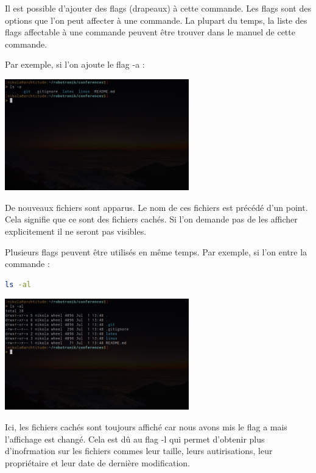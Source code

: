 Il est possible d'ajouter des flags (drapeaux) à cette commande. Les flags sont des options que l'on peut affecter à une commande. La plupart du temps, la liste des flags affectable à une commande peuvent être trouver dans le manuel de cette commande.

Par exemple, si l'on ajoute le flag -a :

\begin{center}
	\includegraphics[width=0.6\textwidth]{Images/ls-a.png}
\end{center}

De nouveaux fichiers sont apparus. Le nom de ces fichiers est précédé d'un point. Cela signifie que ce sont des fichiers cachés. Si l'on demande pas de les afficher explicitement il ne seront pas visibles.

Plusieurs flags peuvent être utilisés en même temps. Par exemple, si l'on entre la commande :
\begin{lstlisting}[language=bash]
	ls -al
\end{lstlisting}

\begin{center}
	\includegraphics[width=0.6\textwidth]{Images/ls-al.png}
\end{center}

Ici, les fichiers cachés sont toujours affiché car nous avons mis le flag a mais l'affichage est changé. Cela est dû au flag -l qui permet d'obtenir plus d'inofrmation sur les fichiers commes leur taille, leurs autirisations, leur propriétaire et leur date de dernière modification.

